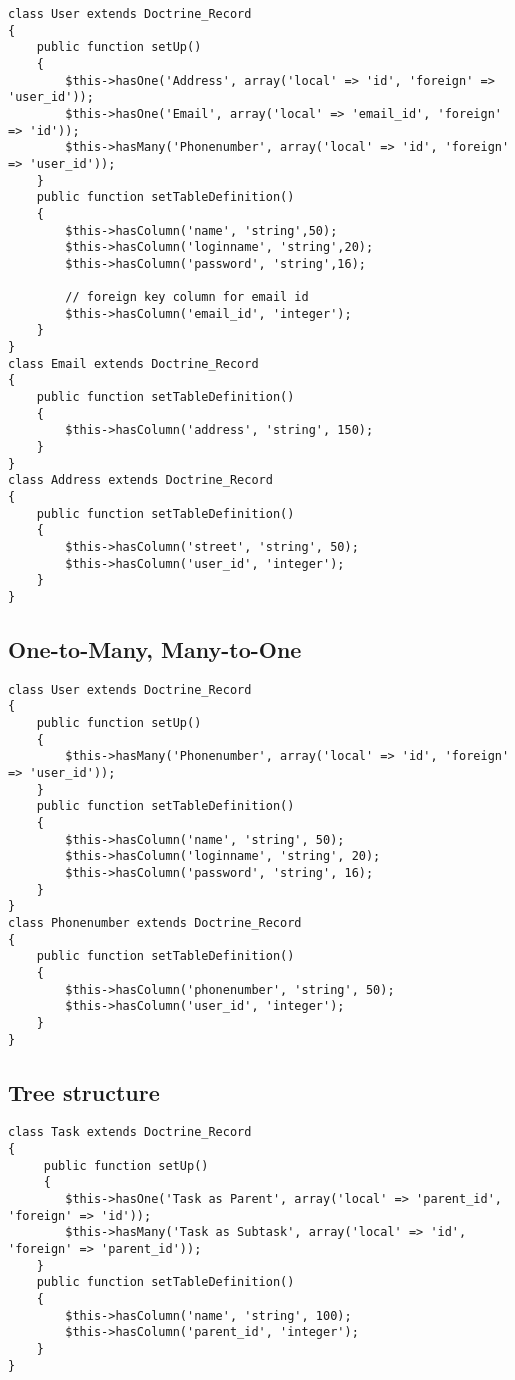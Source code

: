 \documentclass[11pt,a4paper]{report}
\begin{document}
\begin{verbatim}
class User extends Doctrine_Record
{
    public function setUp()
    {
        $this->hasOne('Address', array('local' => 'id', 'foreign' => 'user_id'));
        $this->hasOne('Email', array('local' => 'email_id', 'foreign' => 'id'));
        $this->hasMany('Phonenumber', array('local' => 'id', 'foreign' => 'user_id'));
    }
    public function setTableDefinition()
    {
        $this->hasColumn('name', 'string',50);
        $this->hasColumn('loginname', 'string',20);
        $this->hasColumn('password', 'string',16);

        // foreign key column for email id
        $this->hasColumn('email_id', 'integer');
    }
}
class Email extends Doctrine_Record
{
    public function setTableDefinition()
    {
        $this->hasColumn('address', 'string', 150);
    }
}
class Address extends Doctrine_Record
{
    public function setTableDefinition()
    {
        $this->hasColumn('street', 'string', 50);
        $this->hasColumn('user_id', 'integer');
    }
}
\end{verbatim}

\subsection{One-to-Many, Many-to-One}
\begin{verbatim}
class User extends Doctrine_Record
{
    public function setUp()
    {
        $this->hasMany('Phonenumber', array('local' => 'id', 'foreign' => 'user_id'));
    }
    public function setTableDefinition()
    {
        $this->hasColumn('name', 'string', 50);
        $this->hasColumn('loginname', 'string', 20);
        $this->hasColumn('password', 'string', 16);
    }
}
class Phonenumber extends Doctrine_Record
{
    public function setTableDefinition()
    {
        $this->hasColumn('phonenumber', 'string', 50);
        $this->hasColumn('user_id', 'integer');
    }
}
\end{verbatim}

\subsection{Tree structure}
\begin{verbatim}
class Task extends Doctrine_Record
{
     public function setUp()
     {
        $this->hasOne('Task as Parent', array('local' => 'parent_id', 'foreign' => 'id'));
        $this->hasMany('Task as Subtask', array('local' => 'id', 'foreign' => 'parent_id'));
    }
    public function setTableDefinition()
    {
        $this->hasColumn('name', 'string', 100);
        $this->hasColumn('parent_id', 'integer');
    }
}
\end{verbatim}
\end{document}
